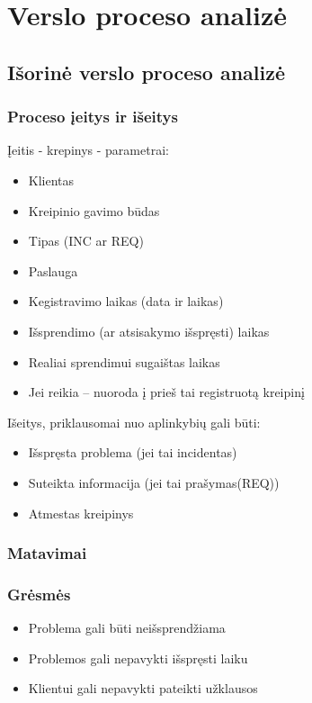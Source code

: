 \section{Verslo proceso analizė}

	\subsection{Išorinė verslo proceso analizė}

		\subsubsection{Proceso įeitys ir išeitys}

			Įeitis - krepinys - parametrai:
			\begin{itemize}
			\item Klientas
			\item Kreipinio gavimo būdas
			\item Tipas (INC ar REQ)
			\item Paslauga
			\item Kegistravimo laikas (data ir laikas)
			\item Išsprendimo (ar atsisakymo išspręsti) laikas
			\item Realiai sprendimui sugaištas laikas
			\item Jei reikia – nuoroda į prieš tai registruotą kreipinį
			\end{itemize}

			Išeitys, priklausomai nuo aplinkybių gali būti:
			\begin{itemize}
				\item Išspręsta problema (jei tai incidentas)
				\item Suteikta informacija (jei tai prašymas(REQ))
				\item Atmestas kreipinys
			\end{itemize}

		\subsubsection{Matavimai}

		\subsubsection{Grėsmės}
			\begin{itemize}
				\item Problema gali būti neišsprendžiama
				\item Problemos gali nepavykti išspręsti laiku
				\item Klientui gali nepavykti pateikti užklausos
			\end{itemize}

